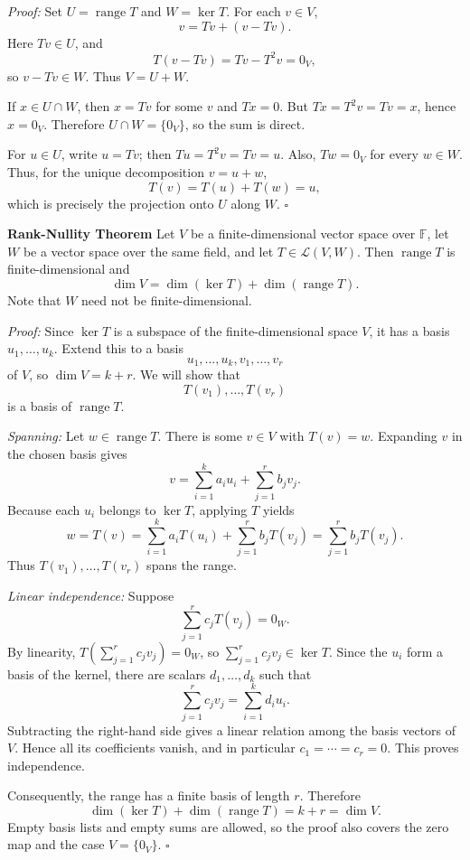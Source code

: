 \documentclass[a4paper,11pt,abstract=true]{scrartcl}
\theoremstyle{dotlessP}
\theoremstyle{dotlessS}
\theoremstyle{remark}
\theoremstyle{definition}
\begin{document}
\begin{claim_box}
\textit{Proof:} Set $U=\operatorname{range}T$ and $W=\ker T$.
For each $v\in V$,
\[
v=Tv+(v-Tv).
\]
Here $Tv\in U$, and
\[
T(v-Tv)=Tv-T^2v=0_V,
\]
so $v-Tv\in W$. Thus $V=U+W$.

If $x\in U\cap W$, then $x=Tv$ for some $v$ and $Tx=0$. But
$Tx=T^2v=Tv=x$, hence $x=0_V$. Therefore $U\cap W=\{0_V\}$,
so the sum is direct.

For $u\in U$, write $u=Tv$; then $Tu=T^2v=Tv=u$. Also, $Tw=0_V$
for every $w\in W$. Thus, for the unique decomposition $v=u+w$,
\[
T(v)=T(u)+T(w)=u,
\]
which is precisely the projection onto $U$ along $W$.
\hfill$\square$
\end{claim_box}

\begin{problem_box}
\textbf{Rank-Nullity Theorem}
Let $V$ be a
finite-dimensional vector space over $\mathbb{F}$, let $W$ be a vector
space over the same field, and let $T\in\mathcal{L}(V,W)$. Then
$\operatorname{range}T$ is finite-dimensional and
\[
\dim V=\dim(\ker T)+\dim(\operatorname{range}T).
\]
Note that $W$ need not be
finite-dimensional.
\end{problem_box}

\begin{claim_box}
\textit{Proof:} Since $\ker T$ is a subspace of the finite-dimensional
space $V$, it has a basis $u_1,\ldots,u_k$. Extend this to a basis
\[
u_1,\ldots,u_k,v_1,\ldots,v_r
\]
of $V$, so $\dim V=k+r$. We will show that
\[
T(v_1),\ldots,T(v_r)
\]
is a basis of $\operatorname{range}T$.

\emph{Spanning:} Let $w\in\operatorname{range}T$. There is some $v\in V$
with $T(v)=w$. Expanding $v$ in the chosen basis gives
\[
v=\sum_{i=1}^k a_i u_i+\sum_{j=1}^r b_j v_j.
\]
Because each $u_i$ belongs to $\ker T$, applying $T$ yields
\[
w=T(v)=\sum_{i=1}^k a_i T(u_i)+\sum_{j=1}^r b_j T(v_j)
=\sum_{j=1}^r b_j T(v_j).
\]
Thus $T(v_1),\ldots,T(v_r)$ spans the range.

\emph{Linear independence:} Suppose
\[
\sum_{j=1}^r c_j T(v_j)=0_W.
\]
By linearity, $T(\sum_{j=1}^r c_j v_j)=0_W$, so
$\sum_{j=1}^r c_j v_j\in\ker T$. Since the $u_i$ form a basis of the
kernel, there are scalars $d_1,\ldots,d_k$ such that
\[
\sum_{j=1}^r c_j v_j=\sum_{i=1}^k d_i u_i.
\]
Subtracting the right-hand side gives a linear relation among the basis
vectors of $V$. Hence all its coefficients vanish, and in particular
$c_1=\cdots=c_r=0$. This proves independence.

Consequently, the range has a finite basis of length $r$. Therefore
\[
\dim(\ker T)+\dim(\operatorname{range}T)=k+r=\dim V.
\]
Empty basis lists and empty sums are allowed, so the proof also covers
the zero map and the case $V=\{0_V\}$. \hfill$\square$
\end{claim_box}
\end{document}
